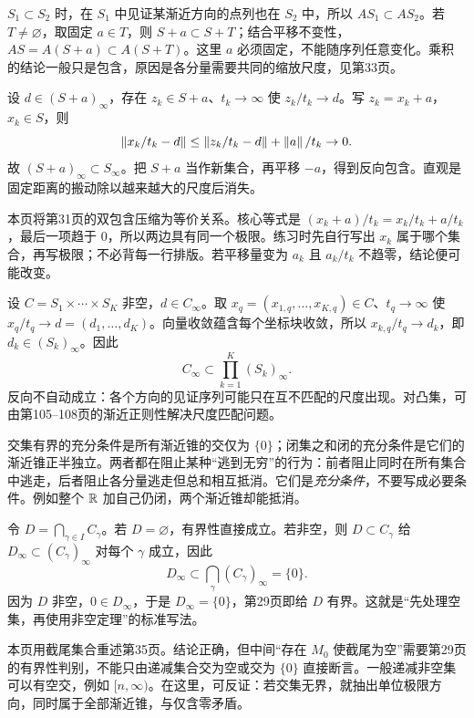 $S_1\subset S_2$ 时，在 $S_1$ 中见证某渐近方向的点列也在 $S_2$ 中，所以 $AS_1\subset AS_2$。若 $T\ne\varnothing$，取固定 $a\in T$，则 $S+a\subset S+T$；结合平移不变性，$AS=A(S+a)\subset A(S+T)$。这里 $a$ 必须固定，不能随序列任意变化。乘积的结论一般只是包含，原因是各分量需要共同的缩放尺度，见第33页。

设 $d\in(S+a)_\infty$，存在 $z_k\in S+a$、$t_k\to\infty$ 使 $z_k/t_k\to d$。写 $z_k=x_k+a$，$x_k\in S$，则
\[\left\lVert x_k/t_k-d\right\rVert\le\left\lVert z_k/t_k-d\right\rVert+\left\lVert a\right\rVert/t_k\to0.\]
故 $(S+a)_\infty\subset S_\infty$。把 $S+a$ 当作新集合，再平移 $-a$，得到反向包含。直观是固定距离的搬动除以越来越大的尺度后消失。

本页将第31页的双包含压缩为等价关系。核心等式是 $(x_k+a)/t_k=x_k/t_k+a/t_k$，最后一项趋于 $0$，所以两边具有同一个极限。练习时先自行写出 $x_k$ 属于哪个集合，再写极限；不必背每一行排版。若平移量变为 $a_k$ 且 $a_k/t_k$ 不趋零，结论便可能改变。

设 $C=S_1\times\cdots\times S_K$ 非空，$d\in C_\infty$。取 $x_q=(x_{1,q},\ldots,x_{K,q})\in C$、$t_q\to\infty$ 使 $x_q/t_q\to d=(d_1,\ldots,d_K)$。向量收敛蕴含每个坐标块收敛，所以 $x_{k,q}/t_q\to d_k$，即 $d_k\in(S_k)_\infty$。因此
\[C_\infty\subset\prod_{k=1}^K(S_k)_\infty.\]
反向不自动成立：各个方向的见证序列可能只在互不匹配的尺度出现。对凸集，可由第105--108页的渐近正则性解决尺度匹配问题。

交集有界的充分条件是所有渐近锥的交仅为 $\{0\}$；闭集之和闭的充分条件是它们的渐近锥正半独立。两者都在阻止某种“逃到无穷”的行为：前者阻止同时在所有集合中逃走，后者阻止各分量逃走但总和相互抵消。它们是\emph{充分条件}，不要写成必要条件。例如整个 $\mathbb{R}$ 加自己仍闭，两个渐近锥却能抵消。

令 $D=\bigcap_{\gamma\in I}C_\gamma$。若 $D=\varnothing$，有界性直接成立。若非空，则 $D\subset C_\gamma$ 给 $D_\infty\subset(C_\gamma)_\infty$ 对每个 $\gamma$ 成立，因此
\[D_\infty\subset\bigcap_\gamma(C_\gamma)_\infty=\{0\}.\]
因为 $D$ 非空，$0\in D_\infty$，于是 $D_\infty=\{0\}$，第29页即给 $D$ 有界。这就是“先处理空集，再使用非空定理”的标准写法。

本页用截尾集合重述第35页。结论正确，但中间“存在 $M_0$ 使截尾为空”需要第29页的有界性判别，不能只由递减集合交为空或交为 $\{0\}$ 直接断言。一般递减非空集可以有空交，例如 $[n,\infty)$。在这里，可反证：若交集无界，就抽出单位极限方向，同时属于全部渐近锥，与仅含零矛盾。

